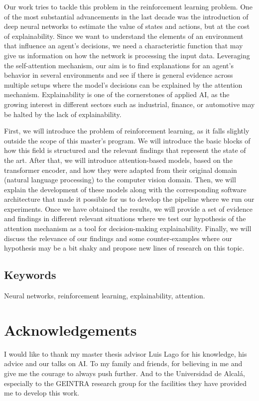 Our work tries to tackle this problem in the reinforcement learning problem. One of the most substantial advancements in the last decade was the introduction of deep neural networks to estimate the value of states and actions, but at the cost of explainability. Since we want to understand the elements of an environment that influence an agent's decisions, we need a characteristic function that may give us information on how the network is processing the input data. Leveraging the self-attention mechanism, our aim is to find explanations for an agent's behavior in several environments and see if there is general evidence across multiple setups where the model's decisions can be explained by the attention mechanism. Explainability is one of the cornerstones of applied AI, as the growing interest in different sectors such as industrial, finance, or automotive may be halted by the lack of explainability.

First, we will introduce the problem of reinforcement learning, as it falls slightly outside the scope of this master's program. We will introduce the basic blocks of how this field is structured and the relevant findings that represent the state of the art. After that, we will introduce attention-based models, based on the transformer encoder, and how they were adapted from their original domain (natural language processing) to the computer vision domain. Then, we will explain the development of these models along with the corresponding software architecture that made it possible for us to develop the pipeline where we run our experiments. Once we have obtained the results, we will provide a set of evidence and findings in different relevant situations where we test our hypothesis of the attention mechanism as a tool for decision-making explainability. Finally, we will discuss the relevance of our findings and some counter-examples where our hypothesis may be a bit shaky and propose new lines of research on this topic.

\vfill
\section*{Keywords}
Neural networks, reinforcement learning, explainability, attention.

\newpage
\chapter*{Acknowledgements}
I would like to thank my master thesis advisor Luis Lago for his knowledge, his advice and our talks on AI. To my family and friends, for believing in me and give me the courage to always push further. And to the Universidad de Alcalá, especially to the GEINTRA research group for the facilities they have provided me to develop this work.